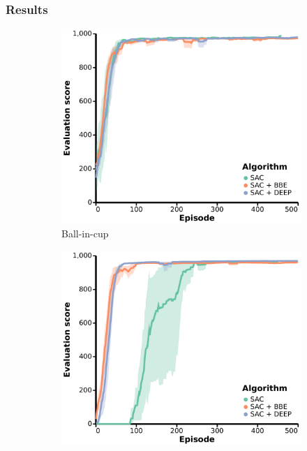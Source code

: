 \subsubsection{Results}
\begin{figure}[ht]
    \centering
    \begin{subfigure}[b]{0.24\textwidth}
        \centering
        \includegraphics[width=\textwidth]{figures/deep/neurips_ball_in_cup.pdf}
        \caption{Ball-in-cup}
    \end{subfigure}
    \begin{subfigure}[b]{0.24\textwidth}
        \centering
        \includegraphics[width=\textwidth]{figures/deep/neurips_ball_in_cup_explore.pdf}

\end{subfigure}
\end{figure}
